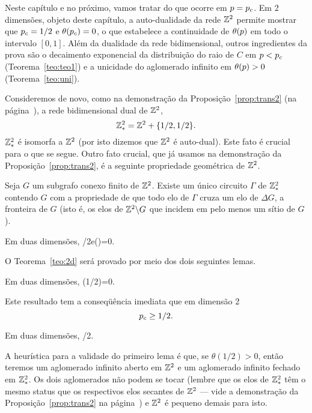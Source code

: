 Neste capítulo e no próximo, vamos tratar do que ocorre em $p=p_c$.
Em 2 dimensões, objeto deste capítulo, a auto-dualidade da rede $\mathbb{Z}^2$ 
permite mostrar que $p_c=1/2$ e $\theta(p_c)=0$, o que estabelece a
continuidade de $\theta(p)$ em todo o intervalo $[0,1]$. 
Além da dualidade da rede bidimensional, outros 
ingredientes da prova são o decaimento exponencial da distribuição 
do raio de $C$ em $p<p_c$ (Teorema~\ref{teo:teo1}) e a unicidade do 
aglomerado infinito em $\theta(p)>0$ (Teorema~\ref{teo:uni}).

Consideremos de novo, como na demonstração da Proposição~\ref{prop:trans2} 
(na página~\pageref{trans2}), a rede bidimensional dual de $\mathbb{Z}^2$, 
$$\mathbb{Z}^2_\ast=\mathbb{Z}^2+\{1/2,1/2\}.$$
$\mathbb{Z}^2_\ast$ é isomorfa a $\mathbb{Z}^2$ (por isto dizemos que $\mathbb{Z}^2$ é auto-dual).
Este fato é crucial para o que se segue. Outro fato crucial, que
já usamos na demonstração da Proposição~\ref{prop:trans2}, é a 
seguinte propriedade geométrica de $\mathbb{Z}^2$.

\vs

\bpro
\label{pro:geo}
Seja $G$ um subgrafo conexo finito de $\mathbb{Z}^2$. Existe um único circuito
$\Gamma$ de $\mathbb{Z}^2_\ast$ contendo $G$ com a propriedade de que todo elo de
$\Gamma$ cruza um elo de $\Delta G$, a fronteira de $G$ (isto é, os
elos de $\mathbb{Z}^2\backslash G$ que incidem em pelo menos um sítio de $G$).
\epro

\vs


\bte
\label{teo:2d}
Em duas dimensões,
\beqnn
{}/2\quad\mbox{e}\quad\theta(\pce)=0.
\eeqnn
\ete

\vs

O Teorema~\ref{teo:2d} será provado por meio dos dois seguintes lemas.

\vs

\ble
\label{le:leb1}
Em duas dimensões,
\beqnn
\theta(1/2)=0.
\eeqnn
\ele

\vs

\bob
Este resultado tem a conseqüência imediata que em dimensão 2$$p_c\geq1/2.$$
\eob

\vs

\ble
\label{le:leb2}
Em duas dimensões,
\beqnn
\pce{}/2.
\eeqnn
\ele

\vs

A heurística para a validade do primeiro lema é que, se $\theta(1/2)>0$, 
então teremos um aglomerado infinito aberto em $\mathbb{Z}^2$ e 
um aglomerado infinito fechado em $\mathbb{Z}^2_\ast$. Os dois aglomerados não podem
se tocar (lembre que os elos de $\mathbb{Z}^2_\ast$ têm o mesmo status que os respectivos
elos secantes de $\mathbb{Z}^2$ --- vide a demonstração da Proposição~\ref{prop:trans2}
na página~\pageref{trans2}) e $\mathbb{Z}^2$ é pequeno demais para isto.

